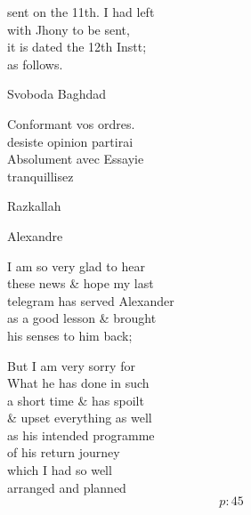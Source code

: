 \documentclass{report}
\begin{document}

	\par{
 	sent on the 11th. I had left\ \\with Jhony to be sent,\ \\it is dated the 12th Instt;\ \\as follows.\ \\
	}

	\par{
 	Svoboda Baghdad\ \\
	}

	\par{
 	Conformant vos ordres.\ \\desiste opinion partirai\ \\Absolument avec Essayie\ \\tranquillisez\ \\
	}

	\par{
 	Razkallah\ \\
	}

	\par{
 	Alexandre\ \\
	}

	\par{
 	I am so very glad to hear\ \\these news \& hope my last\ \\telegram has served Alexander\ \\as a good lesson \& brought\ \\his senses to him back;\ \\
	}

	\par{
 	But I am very sorry for\ \\What he has done in such\ \\a short time \& has spoilt\ \\\& upset everything as well\ \\as his intended programme\ \\of his return journey\ \\which I had so well\ \\arranged and planned\ \\
  \[p: 45 \]

	}




\end{document}
